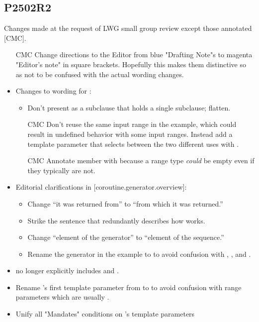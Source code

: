 \documentclass{wg21}
\begin{document}
\subsection{P2502R2}
Changes made at the request of LWG small group review except those annotated
[CMC].
\begin{itemize}
\item [CMC] Change directions to the Editor from blue "Drafting Note"s to
  magenta "Editor's note" in square brackets. Hopefully this makes them
  distinctive so as not to be confused with the actual wording changes.
\item Changes to wording for :
  \begin{itemize}
    \item Don't present as a subclause that holds a single subclause; flatten.
    \item [CMC] Don't reuse the same input range in the example, which could
      result in undefined behavior with some input ranges. Instead add a
       template parameter that selects between the two different
      uses with .
    \item [CMC] Annotate member  with 
      because a range type \emph{could} be empty even if they typically are not.
  \end{itemize}
\item Editorial clarifications in [coroutine.generator.overview]:
  \begin{itemize}
    \item Change ``it was returned from'' to ``from which it was returned.''
    \item Strike the sentence that redundantly describes how 
      works.
    \item Change ``element of the generator'' to ``element of the sequence.''
    \item Rename the  generator in the example to 
      to avoid confusion with , ,
      and .
  \end{itemize}
\item {} no longer explicitly includes
   and .
\item Rename 's first template parameter
  from  to  to avoid confusion with range parameters which
  are usually .
\item Unify all "Mandates" conditions on 's template parameters

\end{itemize}
\end{document}
